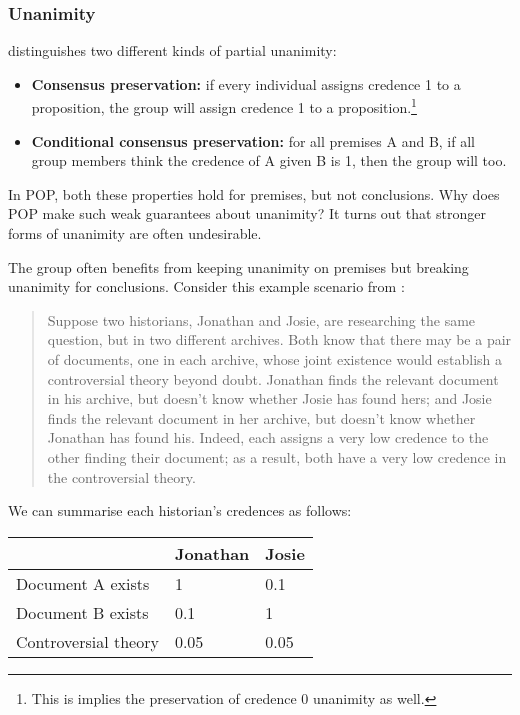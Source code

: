 \documentclass{article}
\begin{document}
\subsubsection{Unanimity}

\citet{dietrich2013probabilistic} distinguishes two different kinds of partial unanimity:

\begin{itemize}
	\item \textbf{Consensus preservation:} if every individual assigns credence 1 to a proposition, the group will assign credence 1 to a proposition.\footnote{This is implies the preservation of credence 0 unanimity as well.}
	\item \textbf{Conditional consensus preservation:} for all premises A and B, if all group members think the credence of A given B is 1, then the group will too.
\end{itemize}

\noindent
In POP, both these properties hold for premises, but not conclusions. Why does POP make such weak guarantees about unanimity? It turns out that stronger forms of unanimity are often undesirable.

The group often benefits from keeping unanimity on premises but breaking unanimity for conclusions. Consider this example scenario from \citep{pettigrew2016accuracy}: 

\begin{quote}
Suppose two historians, Jonathan and Josie, are researching the same question, but in two different archives. Both know that there may be a pair of documents, one in each archive, whose joint existence would establish a controversial theory beyond doubt. Jonathan finds the relevant document in his archive, but doesn't know whether Josie has found hers; and Josie finds the relevant document in her archive, but doesn't know whether Jonathan has found his. Indeed, each assigns a very low credence to the other finding their document; as a result, both have a very low credence in the controversial theory.
\end{quote}

\noindent
We can summarise each historian's credences as follows:

\begin{center}
\begin{tabular}{ | l | l | l |}
  \hline
    & Jonathan & Josie \\ \hline
  Document A exists & 1 & 0.1 \\ \hline
  Document B exists & 0.1  & 1 \\ \hline
  Controversial theory & 0.05  & 0.05 \\
  \hline
\end{tabular}
\end{center}
\end{document}
